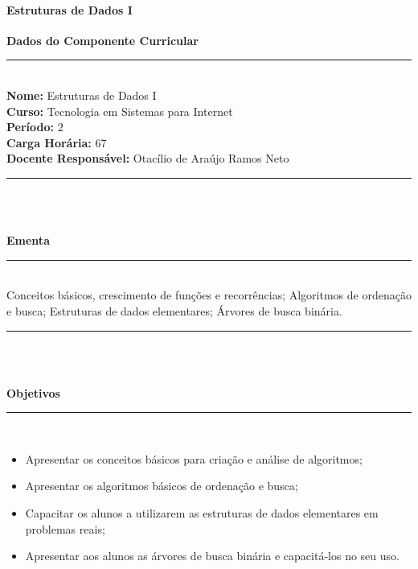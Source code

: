 \paragraph{Estruturas de Dados I}

\begin{center}\textbf{Dados do Componente Curricular}\end{center}
\vspace{-5mm}
\noindent\rule{16.5cm}{0.4pt}
\\
\textbf{Nome:} Estruturas de Dados I
\\ 
\textbf{Curso:} Tecnologia em Sistemas para Internet
\\ 
\textbf{Período:} \unit{2}{\degree}
\\ 
\textbf{Carga Horária:} \unit{67}{\hour}
\\ 
\textbf{Docente Responsável:} Otacílio de Araújo Ramos Neto
\\ 
\noindent\rule{16.5cm}{0.4pt}\\
\\
\vspace{-12mm}
\begin{center}\textbf{Ementa}\end{center}
\vspace{-5mm}
\noindent\rule{16.5cm}{0.4pt}
\\
Conceitos básicos, crescimento de funções e recorrências; Algoritmos de ordenação e busca; Estruturas de dados elementares; Árvores de busca binária.\\ 
\noindent\rule{16.5cm}{0.4pt}\\
\\
\vspace{-12mm}
\begin{center}\textbf{Objetivos}\end{center}
\vspace{-5mm}
\noindent\rule{16.5cm}{0.4pt}
\\
\begin{itemize}
\item Apresentar os conceitos básicos para criação e análise de algoritmos;
\item Apresentar os algoritmos básicos de ordenação e busca;
\item Capacitar os alunos a utilizarem as estruturas de dados elementares em problemas reais;
\item Apresentar aos alunos as árvores de busca binária e capacitá-los no seu uso.
\end{itemize} 
